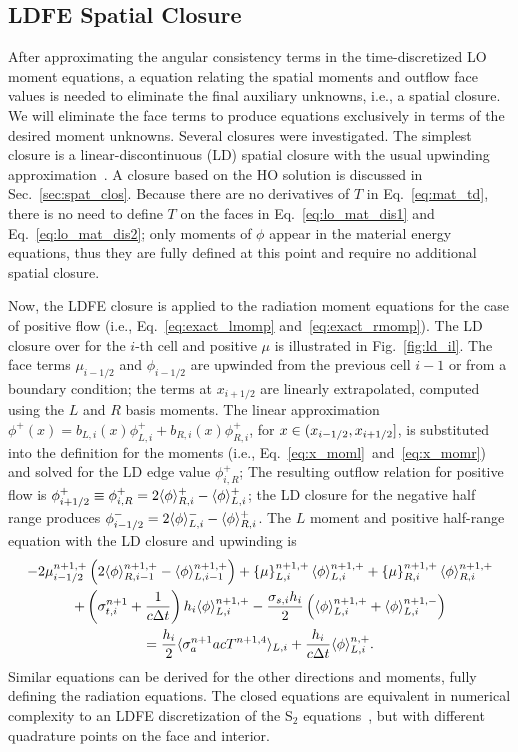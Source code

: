 \subsection{LDFE Spatial Closure}

After approximating the angular consistency terms in the time-discretized LO moment equations, 
a equation relating the spatial moments and outflow face values is
needed to eliminate the final auxiliary unknowns, i.e., a spatial closure.
We will eliminate the face terms to produce equations exclusively in terms of the desired moment
unknowns.  Several closures were investigated.  The simplest closure
is a linear-discontinuous (LD) spatial closure with the usual upwinding
approximation~\cite{morel_ldtrt}.  A closure based on the HO solution is discussed in
Sec.~\ref{sec:spat_clos}.  Because there are no derivatives of $T$ in Eq.~\eqref{eq:mat_td}, there is no need
to define $T$ on the faces in Eq.~\eqref{eq:lo_mat_dis1} and Eq.~\eqref{eq:lo_mat_dis2};
only moments of $\phi$ appear in the material energy
equations, thus they are fully defined at this point and require no additional spatial
closure.  

Now, the LDFE closure is applied to the radiation moment equations for the case of
positive flow (i.e., Eq.~\eqref{eq:exact_lmomp} and~\eqref{eq:exact_rmomp}). The LD
closure over for the $i$-th cell and positive $\mu$ 
is illustrated in Fig.~\ref{fig:ld_il}.  The face terms $\mu_{i-1/2}$ and $\phi_{i-1/2}$
are upwinded from the previous cell $i-1$ or from a boundary condition; the terms
at $x_{i+1/2}$ are linearly extrapolated, computed using the $L$ and $R$ basis
moments.  The linear approximation $\phi^+(x)=b_{L,i}(x)\phi^+_{L,i} +
b_{R,i}(x)\phi^+_{R,i}$, for $x\in({x_{i-1/2}},{x_{i+1/2}}]$, is substituted into the definition for
the moments (i.e., Eq.~\eqref{eq:x_moml}~and~\eqref{eq:x_momr}) and solved for the LD edge value
$\phi_{i,R}^+$; The resulting outflow relation for positive flow is $\phi^+_{i+1/2} \equiv \phi_{i,R}^+ = 2\langle \phi \rangle_{R,i}^+ -
\langle \phi \rangle_{L,i}^+$; the LD closure for the negative half range produces $\phi^-_{i-1/2} = 2\langle \phi \rangle_{L,i}^- -
\langle \phi \rangle_{R,i}^+$. The $L$ moment and positive half-range equation with the LD closure and upwinding is
\begin{multline} 
    -2{\mu}_{i-1/2}^{n+1,+} \left(2\langle \phi \rangle_{R,i-1}^{n+1,+} -   \langle \phi \rangle_{L,i-1}^{n+1,+}      \right) + \left\{ \mu \right\}_{L,i}^{n+1,+}
  \langle \phi \rangle_{L,i}^{n+1,+}
  +  \left\{ \mu \right\}_{R,i}^{n+1,+}
  \langle \phi \rangle_{R,i}^{n+1,+}\\ +  \left(\sigma_{t,i}^{n+1}+\frac{1}{c \Delta t} \right) h_i 
  \langle \phi \rangle_{L,i}^{n+1,+} -  \frac{\sigma_{s,i} h_i}{2} \left( \langle \phi \rangle_{L,i}^{n+1,+} +
  \langle \phi \rangle_{L,i}^{n+1,-}\right)\\  = \frac{h_i}{2} \langle \sigma_a^{n+1} a c T^{n+1,4} \rangle_{L,i} +
  \frac{h_i}{c\Delta t}\langle \phi \rangle_{L,i}^{n,+}.
\end{multline}
Similar equations can be derived for the other directions and moments, fully defining the radiation
equations.   The closed equations are equivalent in numerical complexity to an LDFE
discretization of the S$_2$ equations~\cite{morel_ldtrt,lewis}, but with different quadrature points on the face
and interior.

